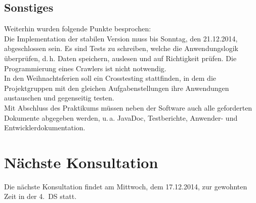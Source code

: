 \documentclass{scrartcl}
\begin{document}
\vspace{1em}

\subsection{Sonstiges}
Weiterhin wurden folgende Punkte besprochen:\\
Die Implementation der stabilen Version muss bis Sonntag, den 21.12.2014, abgeschlossen sein. Es sind Tests zu schreiben, welche die Anwendungslogik überprüfen, d.\,h. Daten speichern, auslesen und auf Richtigkeit prüfen. Die Programmierung eines Crawlers ist nicht notwendig.\\
In den Weihnachtsferien soll ein Crosstesting stattfinden, in dem die Projektgruppen mit den gleichen Aufgabenstellungen ihre Anwendungen austauschen und gegenseitig testen.\\
Mit Abschluss des Praktikums müssen neben der Software auch alle geforderten Dokumente abgegeben werden, u.\,a. JavaDoc, Testberichte, Anwender- und Entwicklerdokumentation.

\vspace{1em}

\section{Nächste Konsultation}
Die nächste Konsultation findet am Mittwoch, dem 17.12.2014, zur gewohnten Zeit in der 4.~DS statt.
\end{document}
